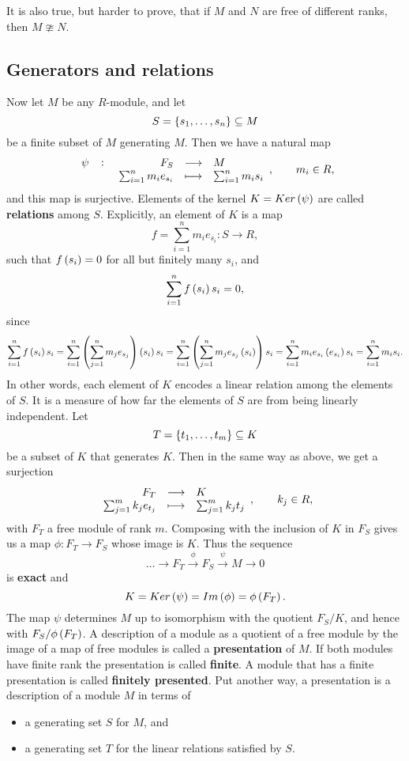 \begin{note*}
It is also true, but harder to prove, that if $ M $ and $ N $ are free of different ranks, then $ M \ncong N $.
\end{note*}

\pagebreak

\subsection{Generators and relations}


Now let $ M $ be any $ R $-module, and let
$$ S = \cbr{s_1, \dots, s_n} \subseteq M $$
be a finite subset of $ M $ generating $ M $. Then we have a natural map
$$ \function[\psi]{F_S}{M}{\sum_{i = 1}^n m_ie_{s_i}}{\sum_{i = 1}^n m_is_i}, \qquad m_i \in R, $$
and this map is surjective. Elements of the kernel $ K = Ker\br{\psi} $ are called \textbf{relations} among $ S $. Explicitly, an element of $ K $ is a map
$$ f = \sum_{i = 1}^n m_ie_{s_i} : S \to R, $$
such that $ f\br{s_i} = 0 $ for all but finitely many $ s_i $, and
$$ \sum_{i = 1}^n f\br{s_i}s_i = 0, $$
since
$$ \sum_{i = 1}^n f\br{s_i}s_i = \sum_{i = 1}^n \br{\sum_{j = 1}^n m_je_{s_j}}\br{s_i}s_i = \sum_{i = 1}^n \br{\sum_{j = 1}^n m_je_{s_j}\br{s_i}}s_i = \sum_{i = 1}^n m_ie_{s_i}\br{e_{s_i}}s_i = \sum_{i = 1}^n m_is_i. $$
In other words, each element of $ K $ encodes a linear relation among the elements of $ S $. It is a measure of how far the elements of $ S $ are from being linearly independent. Let
$$ T = \cbr{t_1, \dots, t_m} \subseteq K $$
be a subset of $ K $ that generates $ K $. Then in the same way as above, we get a surjection
$$ \function{F_T}{K}{\sum_{j = 1}^m k_je_{t_j}}{\sum_{j = 1}^m k_jt_j}, \qquad k_j \in R, $$
with $ F_T $ a free module of rank $ m $. Composing with the inclusion of $ K $ in $ F_S $ gives us a map $ \phi : F_T \to F_S $ whose image is $ K $. Thus the sequence
$$ \dots \to F_T \xrightarrow{\phi} F_S \xrightarrow{\psi} M \to 0 $$
is \textbf{exact} and
$$ K = Ker\br{\psi} = Im\br{\phi} = \phi\br{F_T}. $$
The map $ \psi $ determines $ M $ up to isomorphism with the quotient $ F_S / K $, and hence with $ F_S / \phi\br{F_T} $. A description of a module as a quotient of a free module by the image of a map of free modules is called a \textbf{presentation} of $ M $. If both modules have finite rank the presentation is called \textbf{finite}. A module that has a finite presentation is called \textbf{finitely presented}. Put another way, a presentation is a description of a module $ M $ in terms of
\begin{itemize}
\item a generating set $ S $ for $ M $, and
\item a generating set $ T $ for the linear relations satisfied by $ S $.
\end{itemize}

